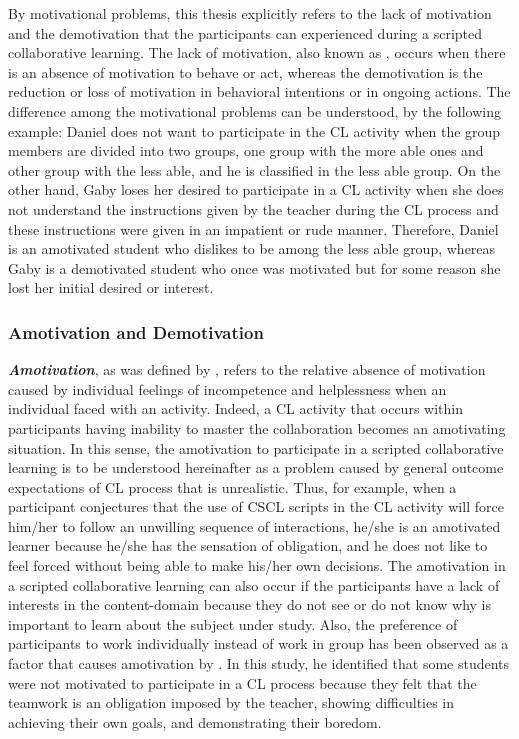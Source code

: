 By motivational problems, this thesis explicitly refers to the lack of motivation and the demotivation that the participants can experienced during a scripted collaborative learning.
The lack of motivation, also known as  \cite{DeciRyan2010}, occurs when there is an absence of motivation to behave or act, whereas the demotivation is the reduction or loss of motivation in behavioral intentions or in ongoing actions.
The difference among the motivational problems can be understood, by the following example:
Daniel does not want to participate in the CL activity when the group members are divided into two groups, one group with the more able ones and other group with the less able, and he is classified in the less able group.
On the other hand, Gaby loses her desired to participate in a CL activity when she does not understand the instructions given by the teacher during the CL process and these instructions were given in an impatient or rude manner.
Therefore, Daniel is an amotivated student who dislikes to be among the less able group, whereas Gaby is a demotivated student who once was motivated but for some reason she lost her initial desired or interest.

\subsubsection{Amotivation and Demotivation}

\textbf{\emph{Amotivation}}, as was defined by , refers to the relative absence of motivation caused by individual feelings of incompetence and helplessness when an individual faced with an activity.
Indeed, a CL activity that occurs within participants having inability to master the collaboration becomes an amotivating situation.
In this sense, the amotivation to participate in a scripted collaborative learning is to be understood hereinafter as a problem caused by general outcome expectations of CL process that is unrealistic.
Thus, for example, when a participant conjectures that the use of CSCL scripts in the CL activity will force him/her to follow an unwilling sequence of interactions, he/she is an amotivated learner because he/she has the sensation of obligation, and he does not like to feel forced without being able to make his/her own decisions. 
The amotivation in a scripted collaborative learning can also occur if the participants have a lack of interests in the content-domain because they do not see or do not know why is important to learn about the subject under study.
Also, the preference of participants to work individually instead of work in group has been observed as a factor that causes amotivation by .
In this study, he identified that some students were not motivated to participate in a CL process because they felt that the teamwork is an obligation imposed by the teacher, showing difficulties in achieving their own goals, and demonstrating their boredom.

